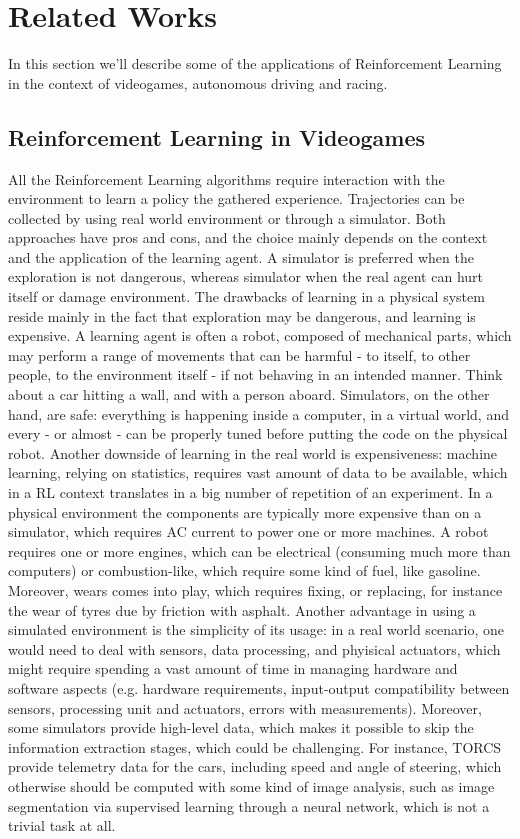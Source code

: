 \section{Related Works}



In this section we'll describe some of the applications of Reinforcement Learning in the context of videogames, autonomous driving and racing. 


\subsection{Reinforcement Learning in Videogames}

All the Reinforcement Learning algorithms require interaction with the environment to learn a policy the gathered experience. Trajectories can be collected by using real world environment or through a simulator. 
Both approaches have pros and cons, and the choice mainly depends on the context and the application of the learning agent. 
A simulator is preferred when the exploration is not dangerous, whereas simulator when the real agent can hurt itself or damage environment. 
The drawbacks of learning in a physical system reside mainly in the fact that exploration may be dangerous, and learning is expensive. A learning agent is often a robot, composed of mechanical parts, which may perform a range of movements that can be harmful - to itself, to other people, to the environment itself - if not behaving in an intended manner. Think about a car hitting a wall, and with a person aboard. Simulators, on the other hand, are safe: everything is happening inside a computer, in a virtual world, and every - or almost - can be properly tuned before putting the code on the physical robot. Another downside of learning in the real world is expensiveness: machine learning, relying on statistics, requires vast amount of data to be available, which in a RL context translates in a big number of repetition of an experiment. In a physical environment the components are typically more expensive than on a simulator, which requires AC current to power one or more machines. A robot requires one or more engines, which can be electrical (consuming much more than computers) or combustion-like, which require some kind of fuel, like gasoline. Moreover, wears comes into play, which requires fixing, or replacing, for instance the wear of tyres due by friction with asphalt. 
Another advantage in using a simulated environment is the simplicity of its usage: in a real world scenario, one would need to deal with sensors, data processing, and phyisical actuators, which might require spending a vast amount of time in managing hardware and software aspects (e.g. hardware requirements, input-output compatibility between sensors, processing unit and actuators, errors with measurements). Moreover, some simulators provide high-level data, which makes it possible to skip the information extraction stages, which could be challenging. For instance, TORCS provide telemetry data for the cars, including speed and angle of steering, which otherwise should be computed with some kind of image analysis, such as image segmentation via supervised learning through a neural network, which is not a trivial task at all. 
